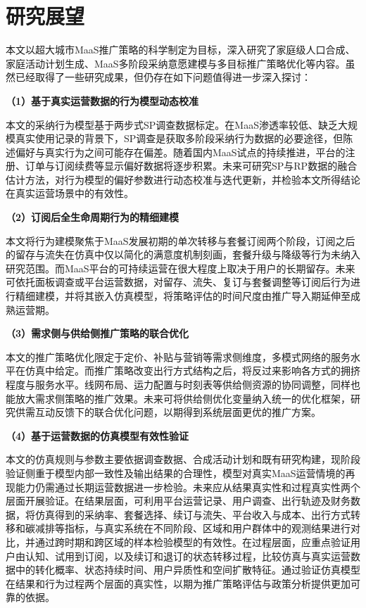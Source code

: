 \section{研究展望}\label{sec.conclusion.outlook}

本文以超大城市MaaS推广策略的科学制定为目标，深入研究了家庭级人口合成、家庭活动计划生成、MaaS多阶段采纳意愿建模与多目标推广策略优化等内容。虽然已经取得了一些研究成果，但仍存在如下问题值得进一步深入探讨：

\textbf{（1）基于真实运营数据的行为模型动态校准}

本文的采纳行为模型基于两步式SP调查数据标定。在MaaS渗透率较低、缺乏大规模真实使用记录的背景下，SP调查是获取多阶段采纳行为数据的必要途径，但陈述偏好与真实行为之间可能存在偏差。随着国内MaaS试点的持续推进，平台的注册、订单与订阅续费等显示偏好数据将逐步积累。未来可研究SP与RP数据的融合估计方法，对行为模型的偏好参数进行动态校准与迭代更新，并检验本文所得结论在真实运营场景中的有效性。

\textbf{（2）订阅后全生命周期行为的精细建模}

本文将行为建模聚焦于MaaS发展初期的单次转移与套餐订阅两个阶段，订阅之后的留存与流失在仿真中仅以简化的满意度机制刻画，套餐升级与降级等行为未纳入研究范围。而MaaS平台的可持续运营在很大程度上取决于用户的长期留存。未来可依托面板调查或平台运营数据，对留存、流失、复订与套餐调整等订阅后行为进行精细建模，并将其嵌入仿真模型，将策略评估的时间尺度由推广导入期延伸至成熟运营期。

\textbf{（3）需求侧与供给侧推广策略的联合优化}

本文的推广策略优化限定于定价、补贴与营销等需求侧维度，多模式网络的服务水平在仿真中给定。而推广策略改变出行方式结构之后，将反过来影响各方式的拥挤程度与服务水平。线网布局、运力配置与时刻表等供给侧资源的协同调整，同样也能放大需求侧策略的推广效果。未来可将供给侧优化变量纳入统一的优化框架，研究供需互动反馈下的联合优化问题，以期得到系统层面更优的推广方案。

\textbf{（4）基于运营数据的仿真模型有效性验证}

本文的仿真规则与参数主要依据调查数据、合成活动计划和既有研究构建，现阶段验证侧重于模型内部一致性及输出结果的合理性，模型对真实MaaS运营情境的再现能力仍需通过长期运营数据进一步检验。未来应从结果真实性和过程真实性两个层面开展验证。在结果层面，可利用平台运营记录、用户调查、出行轨迹及财务数据，将仿真得到的采纳率、套餐选择、续订与流失、平台收入与成本、出行方式转移和碳减排等指标，与真实系统在不同阶段、区域和用户群体中的观测结果进行对比，并通过跨时期和跨区域的样本检验模型的有效性。在过程层面，应重点验证用户由认知、试用到订阅，以及续订和退订的状态转移过程，比较仿真与真实运营数据中的转化概率、状态持续时间、用户异质性和空间扩散特征。通过验证仿真模型在结果和行为过程两个层面的真实性，以期为推广策略评估与政策分析提供更加可靠的依据。
